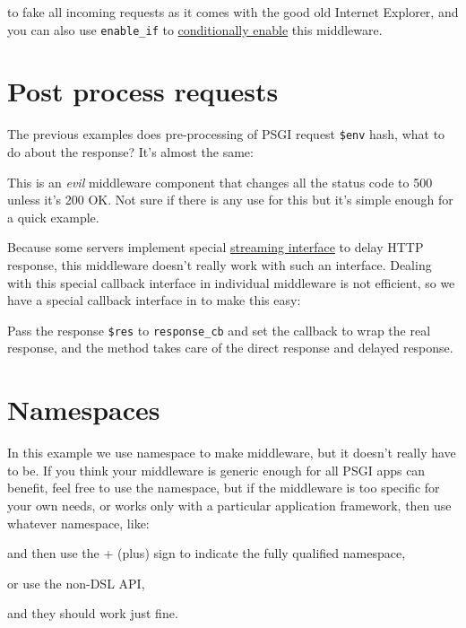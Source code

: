 %
to fake all incoming requests as it comes with the good old Internet
Explorer, and you can also use \lstinline!enable_if! to
\href{http://advent.plackperl.org/2009/12/day-18-load-middleware-conditionally.html}{conditionally
enable} this middleware.

\section{Post process requests}\label{post-process-requests}

The previous examples does pre-processing of PSGI request
\lstinline!$env! hash, what to do about the response? It's almost the
same:


This is an \emph{evil} middleware component that changes all the status
code to 500 unless it's 200 OK. Not sure if there is any use for this
but it's simple enough for a quick example.

Because some servers implement special
\href{http://bulknews.typepad.com/blog/2009/10/psgiplack-streaming-is-now-complete.html}{streaming
interface} to delay HTTP response, this middleware doesn't really work
with such an interface. Dealing with this special callback interface in
individual middleware is not efficient, so we have a special callback
interface in  to make this easy:


Pass the response \lstinline!$res! to \lstinline!response_cb! and set
the callback to wrap the real response, and the method takes care of the
direct response and delayed response.

\section{Namespaces}\label{namespaces}

In this example we use  namespace to make middleware,
but it doesn't really have to be. If you think your middleware is
generic enough for all PSGI apps can benefit, feel free to use the
namespace, but if the middleware is too specific for your own needs, or
works only with a particular application framework, then use whatever
namespace, like:

%
and then use the + (plus) sign to indicate the fully qualified
namespace,

%
or use the non-DSL API,

%
and they should work just fine.

